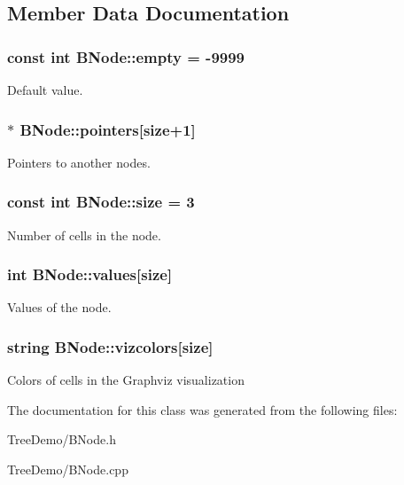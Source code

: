 \subsection{Member Data Documentation}
\hypertarget{class_b_node_a85dc0d85a7353df2f327d825481d0406}{
\subsubsection[{empty}]{\setlength{\rightskip}{0pt plus 5cm}const int B\+Node\+::empty = -\/9999\hspace{0.3cm}{\ttfamily [static]}}}\label{class_b_node_a85dc0d85a7353df2f327d825481d0406}
Default value. \hypertarget{class_b_node_a4be31193c63fe1a8893a0582b39c2d44}{
\subsubsection[{pointers}]{$\ast$ B\+Node\+::pointers\mbox{[}{\bf size}+1\mbox{]}}}\label{class_b_node_a4be31193c63fe1a8893a0582b39c2d44}
Pointers to another nodes. \hypertarget{class_b_node_a43b413611bf924cac0a30d8e343157a2}{
\subsubsection[{size}]{\setlength{\rightskip}{0pt plus 5cm}const int B\+Node\+::size = 3\hspace{0.3cm}{\ttfamily [static]}}}\label{class_b_node_a43b413611bf924cac0a30d8e343157a2}
Number of cells in the node. \hypertarget{class_b_node_a68da613c234fda105be9e77ae198f305}{
\subsubsection[{values}]{\setlength{\rightskip}{0pt plus 5cm}int B\+Node\+::values\mbox{[}{\bf size}\mbox{]}}}\label{class_b_node_a68da613c234fda105be9e77ae198f305}
Values of the node. \hypertarget{class_b_node_afaeb8892e5f2b35cfef5f07ba11a36d3}{
\subsubsection[{vizcolors}]{\setlength{\rightskip}{0pt plus 5cm}string B\+Node\+::vizcolors\mbox{[}{\bf size}\mbox{]}}}\label{class_b_node_afaeb8892e5f2b35cfef5f07ba11a36d3}
Colors of cells in the Graphviz visualization 

The documentation for this class was generated from the following files\+:\begin{DoxyCompactItemize}
\item 
Tree\+Demo/B\+Node.\+h\item 
Tree\+Demo/B\+Node.\+cpp\end{DoxyCompactItemize}
